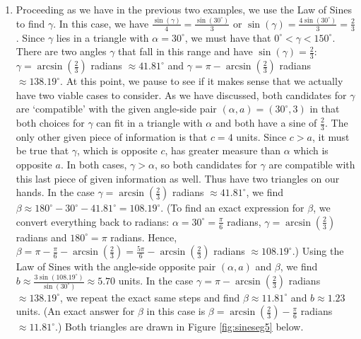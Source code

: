 {\begin{enumerate}
\item  Proceeding as we have in the previous two examples, we use the Law of Sines to find $\gamma$.  In this case, we have $\frac{\sin(\gamma)}{4} = \frac{\sin\left(30^{\circ}\right)}{3}$ or $\sin(\gamma) = \frac{4\sin\left(30^{\circ}\right)}{3} = \frac{2}{3}$.  Since $\gamma$ lies in a triangle with $\alpha = 30^{\circ}$, we must have that $0^{\circ} < \gamma < 150^{\circ}$.   There are two angles $\gamma$ that fall in this range and have $\sin(\gamma) = \frac{2}{3}$:  $\gamma = \arcsin\left(\frac{2}{3}\right)$ radians $\approx 41.81^{\circ}$ and $\gamma = \pi - \arcsin\left(\frac{2}{3}\right)$ radians $\approx 138.19^{\circ}$. At this point, we pause to see if it makes sense that we actually have two viable cases to consider. As we have discussed, both candidates for $\gamma$ are `compatible' with the given angle-side pair $(\alpha, a) = \left(30^{\circ}, 3\right)$ in that both choices for $\gamma$ can fit in a triangle with $\alpha$ and both have a sine of $\frac{2}{3}$.  The only other given piece of information is that $c = 4$ units.  Since $c > a$, it must be true that $\gamma$, which is opposite $c$, has greater measure than $\alpha$ which is opposite $a$.  In both cases, $\gamma > \alpha$, so both candidates for $\gamma$ are compatible with this last piece of given information as well.  Thus have two triangles on our hands.  In the case $\gamma = \arcsin\left(\frac{2}{3}\right)$ radians $\approx 41.81^{\circ}$, we find $\beta \approx 180^{\circ} - 30^{\circ} - 41.81^{\circ}  = 108.19^{\circ}$. (To find an exact expression for $\beta$, we convert everything back to radians:  $\alpha = 30^{\circ} = \frac{\pi}{6}$ radians, $\gamma = \arcsin\left(\frac{2}{3}\right)$ radians and $180^{\circ} = \pi$ radians.  Hence, $\beta = \pi - \frac{\pi}{6} - \arcsin\left(\frac{2}{3}\right) = \frac{5\pi}{6} - \arcsin\left(\frac{2}{3}\right)$ radians $\approx 108.19^{\circ}$.) Using the Law of Sines with the angle-side opposite pair $(\alpha, a)$ and $\beta$, we find $b \approx \frac{3 \sin\left(108.19^{\circ}\right)}{\sin\left(30^{\circ}\right)} \approx 5.70$ units.  In the case $\gamma = \pi - \arcsin\left(\frac{2}{3}\right)$ radians $\approx 138.19^{\circ}$, we repeat the exact same steps and find $\beta \approx 11.81^{\circ}$ and $b \approx 1.23$ units. (An exact answer for $\beta$ in this case is $\beta = \arcsin\left(\frac{2}{3}\right) - \frac{\pi}{6}$ radians $\approx 11.81^{\circ}$.) Both triangles are drawn in Figure \ref{fig:sineseg5} below.

\medskip


\end{enumerate}}
